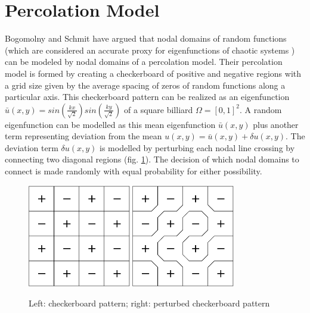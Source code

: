 \documentclass{report}
\begin{document}
\section{Percolation Model}
\label{sec:percolation}
Bogomolny and Schmit \cite{bogomolny} have argued that nodal domains of random functions (which are considered an accurate proxy for eigenfunctions of chaotic systems \cite{heller}) can be modeled by nodal domains of a percolation model. Their percolation model is formed by creating a checkerboard of positive and negative regions with a grid size given by the average spacing of zeros of random functions along a particular axis. This checkerboard pattern can be realized as an eigenfunction $\bar{u}(x,y) = sin(\frac{kx}{\sqrt{2}})sin(\frac{ky}{\sqrt{2}})$ of a square billiard $\Omega = [0,1]^{2}$. A random eigenfunction can be modelled as this mean eigenfunction $\bar{u}(x,y)$ plus another term representing deviation from the mean $u(x,y) = \bar u(x,y) + \delta u(x,y)$. The deviation term $\delta u(x,y)$ is modelled by perturbing each nodal line crossing by connecting two diagonal regions (fig. \ref{fig:percolation}). The decision of which nodal domains to connect is made randomly with equal probability for either possibility.

\begin{figure}
  \begin{center}
    \includegraphics[width=0.4\textwidth]{figs/percolation/checkerboard.eps}
    \hspace{1 cm}
    \includegraphics[width=0.4\textwidth]{figs/percolation/perturbed.eps}
    \caption{Left: checkerboard pattern; right: perturbed checkerboard pattern}
    \label{fig:percolation}
  \end{center}
\end{figure}
\end{document}
